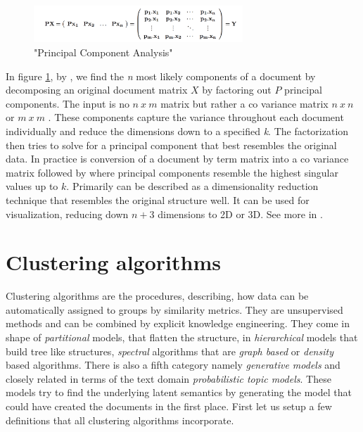     \begin{figure}[h!]
      \centering
        \includegraphics[width=0.7\textwidth]{PCA.png}
        \caption{"Principal Component Analysis"}
        \label{pca}
    \end{figure}

    In figure \ref{pca}, by \cite{PCA2009}, we find the \emph{n} most likely components of a document by decomposing an original document matrix $X$ by factoring out $P$ principal components. The input is no $n\:x\:m$ matrix but rather a co variance matrix $n\:x\:n$ or $m\:x\:m$ . These components capture the variance throughout each document individually and reduce the dimensions down to a specified \emph{k}. The factorization then tries to solve for a principal component that best resembles the original data. In practice \pca{} is conversion of a document by term matrix into a co variance matrix followed by \svd{} where principal components resemble the highest singular values up to $k$. Primarily \pca{} can be described as a dimensionality reduction technique that resembles the original structure well. It can be used for visualization, reducing down $n + 3$ dimensions to 2D or 3D. See more in \cite{PCA2009}.

\section{Clustering algorithms}
\label{sec:clustering}
  
  Clustering algorithms are the procedures, describing, how data can be automatically assigned to groups by similarity metrics. They are unsupervised methods and can be combined by explicit knowledge engineering. They come in shape of \emph{partitional} models, that flatten the structure, in \emph{hierarchical} models that build tree like structures, \emph{spectral} algorithms that are \emph{graph based} or \emph{density} based algorithms. There is also a fifth category namely \emph{generative models} and closely related in terms of the text domain \emph{probabilistic topic models}. These models try to find the underlying latent semantics by generating the model that could have created the documents in the first place. First let us setup a few definitions that all clustering algorithms incorporate.

